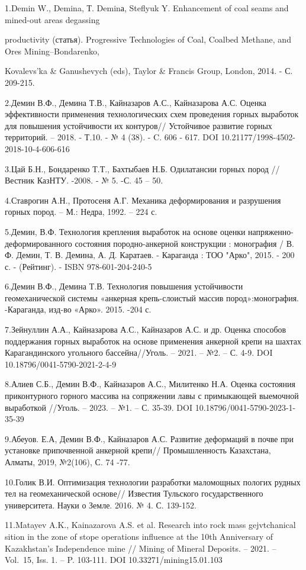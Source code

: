 \begin{noparindent}
1.Demin W., Demina, Т. Deminа, Steflyuk Y. Enhancement of coal seams and
mined-out areas degassing

productivity (статья). Progressive
  Technologies of Coal, Coalbed Methane, and Ores Mining--Bondarenko,
  
  Kovalevs'ka \& Ganushevych (eds), Taylor \& Francis Group, London,
  2014. - С. 209-215.

2.Демин В.Ф., Демина Т.В., Кайназаров А.С., Кайназарова А.С. Оценка
  эффективности применения технологических схем проведения горных
  выработок для повышения устойчивости их контуров// Устойчивое развитие
  горных территорий. -- 2018. - Т.10. - № 4 (38). - C. 606 - 617. DOI
  10.21177/1998-4502-2018-10-4-606-616

3.Цай Б.Н., Бондаренко Т.Т., Бахтыбаев Н.Б. Одилатансии горных пород //
  Вестник КазНТУ. -2008. - № 5. -С. 45 -- 50.

4.Ставрогин А.Н., Протосеня А.Г. Механика деформирования и разрушения
  горных пород. -- М.: Недра, 1992. -- 224 с.

5.Демин, В.Ф. Технология крепления выработок на основе оценки
  напряженно-деформированного состояния породно-анкерной конструкции :
  монография / В. Ф. Демин, Т. В. Демина, А. Д. Каратаев. - Караганда :
  ТОО "Арко", 2015. - 200 с. - (Рейтинг). - ISBN 978-601-204-240-5

6.Демин В.Ф., Демина Т.В. Технология повышения устойчивости
  геомеханической системы «анкерная крепь-слоистый массив
  пород»:монография. -Караганда, изд-во «Арко». 2015. -204 с.

7.Зейнуллин А.А., Кайназарова А.С., Кайназаров А.С. и др. Оценка
  способов поддержания горных выработок на основе применения анкерной
  крепи на шахтах Карагандинского угольного бассейна//Уголь. -- 2021. --
  №2. -- С. 4-9. DOI 10.18796/0041-5790-2021-2-4-9

8.Алиев С.Б., Демин В.Ф., Кайназаров А.С., Милитенко Н.А. Оценка
  состояния приконтурного горного массива на сопряжении лавы с
  примыкающей выемочной выработкой //Уголь. -- 2023. -- №1. -- С. 35-39.
  DOI 10.18796/0041-5790-2023-1-35-39

9.Абеуов. Е.А, Демин В.Ф., Кайназаров А.С. Развитие деформаций в почве
  при установке припочвенной анкерной крепи// Промышленность Казахстана,
  Алматы, 2019, №2(106), С. 74 -77.

10.Голик В.И. Оптимизация технологии разработки маломощных пологих рудных
  тел на геомеханической основе// Известия Тульского государственного
  университета. Науки о Земле. 2016. № 4. С. 139-152.

11.Matayev A.K., Kainazarova A.S. et al. Research into rock mass
  gejvtchanical sition in the zone of stope operations influence at the
  10th Anniversary of Kazakhstan's Independence mine // Mining of
  Mineral Deposits. -- 2021. -- Vol.~15, Iss. 1. -- P. 103-111. DOI
  10.33271/mining15.01.103
\end{noparindent}


